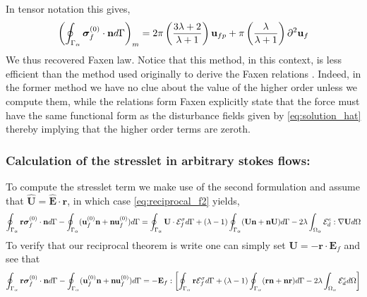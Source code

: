In tensor notation this gives, 
\begin{align*}
    \left(
        \oint_{\Gamma_{\alpha}} \bm\sigma_f^{(0)} \cdot \textbf{n} d\Gamma
    \right)_m
    = 
     2\pi\left(\frac{3\lambda +2 }{\lambda +1}\right)
    \textbf{u}_{fp}  
    + \pi \left(\frac{\lambda }{\lambda +1}\right)\partial^2 \textbf{u}_f
\end{align*}
We thus recovered Faxen law. 
Notice that this method, in this context, is less efficient than the method used originally to derive the Faxen relations \citet{kim2013microhydrodynamics}. 
Indeed, in the former method we have no clue about the value of the higher order unless we compute them, while the relations form Faxen explicitly state that the force must have the same functional form as the disturbance fields given by \ref{eq:solution_hat} thereby implying that the higher order terms are zeroth. 

\subsubsection{Calculation of the stresslet in arbitrary stokes flows:}
To compute the stresslet term we make use of the second formulation and assume that $\hat{\textbf{U}} = \hat{\textbf{E}}\cdot \textbf{r}$, in which case \ref{eq:reciprocal_f2} yields, 
\begin{equation}
    \oint_{\Gamma_{\alpha}} \textbf{r} \bm\sigma_f^{(0)} \cdot \textbf{n} d\Gamma
    - \oint_{\Gamma_{\alpha}} (\textbf{u}_f^{(0)}\textbf{n}+\textbf{nu}_f^{(0)})  d\Gamma
    = 
    \oint_{\Gamma_{\alpha}} \textbf{U}\cdot  \mathcal{E}^\sigma_f d\Gamma
    +(\lambda -1) \oint_{\Gamma_{\alpha}}   (\textbf{U} \textbf{n}+ \textbf{n} \textbf{U})   d\Gamma
    - 2\lambda\int_{\Omega_{\alpha}} \mathcal{E}_d^e : \mathbf{\nabla} \textbf{U} d\Omega
    \label{eq:reciprocal_f2}
\end{equation}
To verify that our reciprocal theorem is write one can simply set $\textbf{U} = - \textbf{r}\cdot \textbf{E}_f$ and see that 
\begin{equation}
    \oint_{\Gamma_{\alpha}} \textbf{r} \bm\sigma_f^{(0)} \cdot \textbf{n} d\Gamma
    - \oint_{\Gamma_{\alpha}} (\textbf{u}_f^{(0)}\textbf{n}+\textbf{nu}_f^{(0)})  d\Gamma
    = 
    - \textbf{E}_f :\left[ \oint_{\Gamma_{\alpha}} \textbf{r}  \mathcal{E}^\sigma_f d\Gamma
    + (\lambda -1) \oint_{\Gamma_{\alpha}}   (\textbf{r}\textbf{n}+ \textbf{n} \textbf{r})   d\Gamma
    - 2\lambda\int_{\Omega_{\alpha}} \mathcal{E}_d^e  d\Omega\right]
    \label{eq:reciprocal_f2}
\end{equation}

